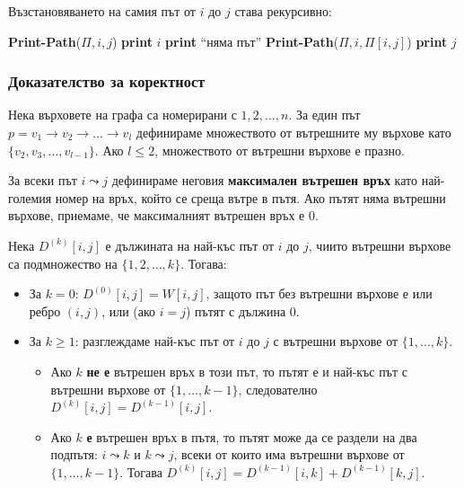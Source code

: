 \documentclass{article}
\renewcommand{\\}{\newline}
\begin{document}
Възстановяването на самия път от \(i\) до \(j\) става рекурсивно:

\begin{algorithmic}[1]
\State \textbf{Print-Path}(\(\Pi, i, j\))
    \State \textbf{print} \(i\)
\Else
        \State \textbf{print} ``няма път''
    \Else
        \State \textbf{Print-Path}(\(\Pi, i, \Pi[i, j]\))
        \State \textbf{print} \(j\)
    \EndIf
\EndIf
\end{algorithmic}

\subsubsection{Доказателство за коректност}

Нека върховете на графа са номерирани с \(1, 2, \dots, n\). За един път \(p = v_1 \to v_2 \to \dots \to v_l\) дефинираме множеството от вътрешните му върхове като \(\{v_2, v_3, \dots, v_{l-1}\}\). Ако \(l \le 2\), множеството от вътрешни върхове е празно.

За всеки път \(i \leadsto j\) дефинираме неговия \textbf{максимален вътрешен връх} като най-големия номер на връх, който се среща вътре в пътя. Ако пътят няма вътрешни върхове, приемаме, че максималният вътрешен връх е \(0\).

Нека \(D^{(k)}[i, j]\) е дължината на най-къс път от \(i\) до \(j\), чиито вътрешни върхове са подмножество на \(\{1, 2, \dots, k\}\). Тогава:

\begin{itemize}
\item За \(k = 0\): \(D^{(0)}[i, j] = W[i, j]\), защото път без вътрешни върхове е или ребро \((i, j)\), или (ако \(i = j\)) пътят с дължина \(0\).
\item За \(k \ge 1\): разглеждаме най-къс път от \(i\) до \(j\) с вътрешни върхове от \(\{1, \dots, k\}\).
    \begin{itemize}
        \item Ако \(k\) \textbf{не е} вътрешен връх в този път, то пътят е и най-къс път с вътрешни върхове от \(\{1, \dots, k-1\}\), следователно \(D^{(k)}[i, j] = D^{(k-1)}[i, j]\).
        \item Ако \(k\) \textbf{е} вътрешен връх в пътя, то пътят може да се раздели на два подпътя: \(i \leadsto k\) и \(k \leadsto j\), всеки от които има вътрешни върхове от \(\{1, \dots, k-1\}\). Тогава \(D^{(k)}[i, j] = D^{(k-1)}[i, k] + D^{(k-1)}[k, j]\).
    \end{itemize}
\end{itemize}
\end{document}
